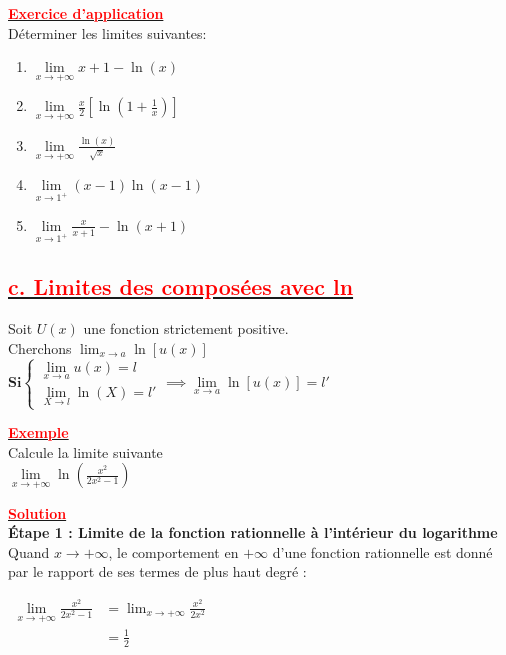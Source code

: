 \documentclass[12pt,a4paper]{article}
\begin{document}
\underline{\textbf{\textcolor{red}{Exercice d'application}}}\\
Déterminer les limites suivantes:

\begin{enumerate}
\item \( \lim\limits_{x \to +\infty} x+1-\ln(x)\)

\item \( \lim\limits_{x \to +\infty} \frac{x}{2}[\ln(1+\frac{1}{x})] \)

\item \( \lim\limits_{x \to +\infty} \frac{\ln(x)}{\sqrt{x}} \)

\item \( \lim\limits_{x \to 1^{+}} (x-1)\ln(x-1) \)

\item \( \lim\limits_{x \to 1^{+}} \frac{x}{x+1}-\ln(x+1) \)
\end{enumerate}

\subsection*{\underline{\textbf{\textcolor{red}{c. Limites des composées avec ln}}}}
Soit $U(x)$ une fonction strictement positive.\\
Cherchons $\lim_{{x \to a}} \ln[u(x)]$\\

$\textbf{Si}
 \begin{cases}
 \lim\limits_{{x \to a}} u(x)=l\\[2mm]
 \lim\limits_{{X \to l}} \ln(X)=l'
 \end{cases} \implies \lim\limits_{{x \to a}} \ln[u(x)]=l'
$

\underline{\textbf{\textcolor{red}{Exemple}}}\\
Calcule la limite suivante\\
$\displaystyle \lim\limits_{x \to +\infty} \ln\left(\frac{x^2}{2x^2 - 1}\right)$

\underline{\textbf{\textcolor{red}{Solution}}}\\

\textbf{Étape 1 : Limite de la fonction rationnelle à l'intérieur du logarithme}\\
Quand $x \to +\infty$, le comportement en $+\infty$ d'une fonction rationnelle est donné par le rapport
                de ses termes de plus haut degré :
                
                $
                \displaystyle
                \begin{aligned}
                \lim\limits_{x \to +\infty} \frac{x^2}{2x^2 - 1} &= \lim_{x \to +\infty} \frac{x^2}{2x^2}\\ 
                                                                 &= \frac{1}{2}
                \end{aligned}
                $
\end{document}

